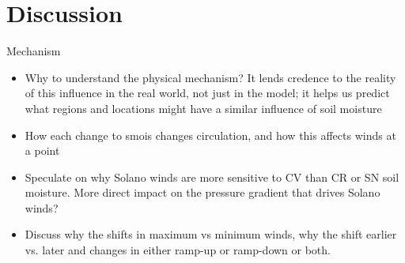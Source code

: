 
%
%
%
%
%

\section{Discussion}

Mechanism
\begin{itemize}
\item Why to understand the physical mechanism?  It lends credence to the reality of this influence in the real world, not just in the model; it helps us predict what regions and locations might have a similar influence of soil moisture
\item How each change to smois changes circulation, and how this affects winds at a point
\item Speculate on why Solano winds are more sensitive to CV than CR or SN soil moisture.  More direct impact on the pressure gradient that drives Solano winds?
\item Discuss why the shifts in maximum vs minimum winds, why the shift earlier vs. later and changes in either ramp-up or ramp-down or both.
\end{itemize}

